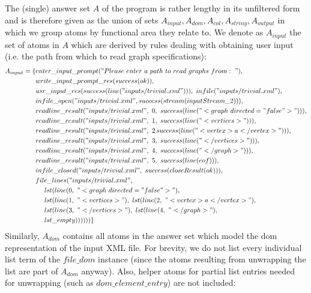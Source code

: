 \begin{example}
The (single) answer set $A$ of the program is rather lengthy in its unfiltered form and is therefore given as the union of sets $A_{input},A_{dom},A_{col},A_{string},A_{output}$ in which we group atoms by functional area they relate to.
We denote as $A_{input}$ the set of atoms in $A$ which are derived by rules dealing with obtaining user input (i.e. the path from which to read graph specifications):
\begin{align*}
    A_{input} = \{&enter\_input\_prompt("Please\ enter\ a\ path\ to\ read\ graphs\ from:\ "),\\
                  &write\_input\_prompt\_res(success(ok)),\\
                  &usr\_input\_res(success(line("inputs/trivial.xml"))),\ infile("inputs/trivial.xml"),\\
                  &infile\_open("inputs/trivial.xml", success(stream(inputStream\_2))),\\
                  &readline\_result("inputs/trivial.xml",\ 0,\ success(line("<graph\ directed="false">"))),\\
                  &readline\_result("inputs/trivial.xml",\ 1,\ success(line("    <vertices>"))),\\
                  &readline\_result("inputs/trivial.xml",\ 2\, success(line("        <vertex>a</vertex>"))),\\
                  &readline\_result("inputs/trivial.xml",\ 3,\ success(line(" </vertices>"))),\\
                  &readline\_result("inputs/trivial.xml",\ 4,\ success(line("</graph>"))),\\
                  &readline\_result("inputs/trivial.xml",\ 5,\ success(line(eof))),\\
                  &infile\_closed("inputs/trivial.xml",\ success(closeResult(ok))),\\
                  &file\_lines("inputs/trivial.xml",\\
                  &~~~~lst(line(0,\ "<graph\ directed="false">"),\\
                  &~~~~lst(line(1,\ "    <vertices>"),\ lst(line(2,\ "        <vertex>a</vertex>"),\\
                  &~~~~lst(line(3,\ "       </vertices>"),\ lst(line(4,\ "</graph>"),\\
                  &~~~~lst\_empty))))))\}
\end{align*} 
Similarly, $A_{dom}$ contains all atoms in the answer set which model the \gls{dom} representation of the input XML file. For brevity, we do not list every individual list term of the $file\_dom$ instance (since the atoms resulting from unwrapping the list are part of $A_{dom}$ anyway). Also, helper atoms for partial list entries needed for unwrapping (such as $dom\_element\_entry$) are not included:

\end{example}
